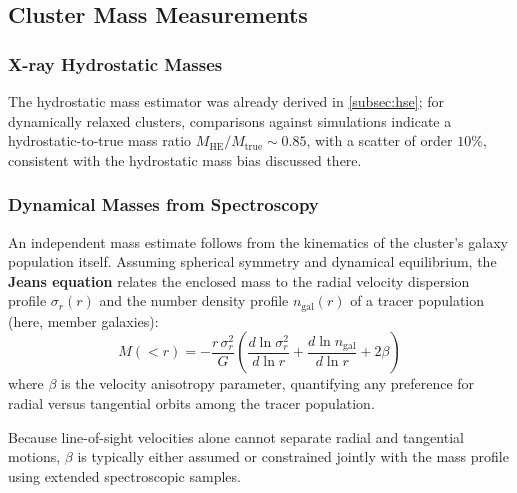 \vspace{-0.5em}

\subsection{Cluster Mass Measurements} \label{subsec:cluster_mass_measurements}

\subsubsection{X-ray Hydrostatic Masses} \label{subsubsec:xray_mass_recap}

The hydrostatic mass estimator was already derived in \cref{subsec:hse}; for dynamically relaxed clusters, comparisons against simulations indicate a hydrostatic-to-true mass ratio $M_{\text{HE}}/M_{\text{true}} \sim 0.85$, with a scatter of order $10\%$, consistent with the hydrostatic mass bias discussed there.

\vspace{-0.5em}

\subsubsection{Dynamical Masses from Spectroscopy} \label{subsubsec:dynamical_mass}

An independent mass estimate follows from the kinematics of the cluster's galaxy population itself. Assuming spherical symmetry and dynamical equilibrium, the \textbf{Jeans equation} relates the enclosed mass to the radial velocity dispersion profile $\sigma_r(r)$ and the number density profile $n_{\text{gal}}(r)$ of a tracer population (here, member galaxies):
$$
M(<r) = -\frac{r\,\sigma_r^2}{G}\left(\frac{d\ln \sigma_r^2}{d\ln r} + \frac{d\ln n_{\text{gal}}}{d\ln r} + 2\beta\right)
$$
where $\beta$ is the velocity anisotropy parameter, quantifying any preference for radial versus tangential orbits among the tracer population.


Because line-of-sight velocities alone cannot separate radial and tangential motions, $\beta$ is typically either assumed or constrained jointly with the mass profile using extended spectroscopic samples.

\smallskip

